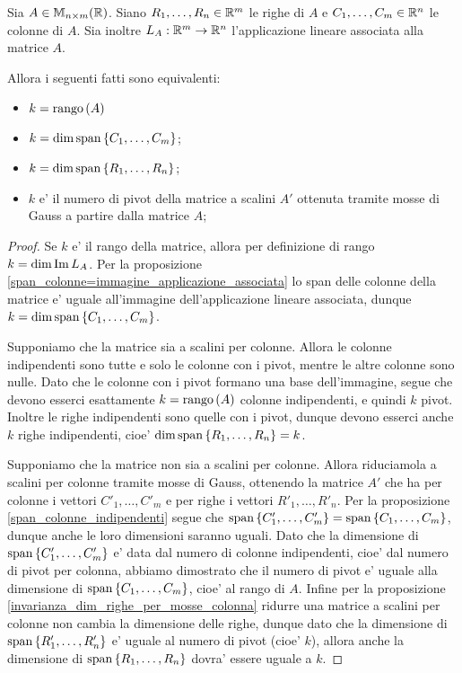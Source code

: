 \begin{proposition}
    Sia $A \in \mathbb{M}_{n \times m}(\mathbb{R})$. Siano $R_1, \dots, R_n \in \mathbb{R}^m$ le righe di $A$ e $C_1, \dots, C_m \in \mathbb{R}^n$ le colonne di $A$. Sia inoltre $L_A : \mathbb{R}^m \to \mathbb{R}^n$ l'applicazione lineare associata alla matrice $A$.
    
    Allora i seguenti fatti sono equivalenti:
    \begin{itemize}
        \item $k = \operatorname{rango}\left( A \right)$
        \item $k = \dim \operatorname{span}\left\{C_1, \dots, C_m\right\}$;
        \item $k = \dim \operatorname{span}\left\{R_1, \dots, R_n\right\}$;
        \item $k$ e' il numero di pivot della matrice a scalini $A'$ ottenuta tramite mosse di Gauss a partire dalla matrice $A$;
    \end{itemize}
\end{proposition}
\begin{proof}
    Se $k$ e' il rango della matrice, allora per definizione di rango $k = \dim \operatorname{Im}L_A$. Per la proposizione \ref{span_colonne=immagine_applicazione_associata} lo span delle colonne della matrice e' uguale all'immagine dell'applicazione lineare associata, dunque $k = \dim \operatorname{span}\left\{C_1, \dots, C_m\right\}$.

    Supponiamo che la matrice sia a scalini per colonne. Allora le colonne indipendenti sono tutte e solo le colonne con i pivot, mentre le altre colonne sono nulle. Dato che le colonne con i pivot formano una base dell'immagine, segue che devono esserci esattamente $k = \operatorname{rango}\left( A \right)$ colonne indipendenti, e quindi $k$ pivot. 
    Inoltre le righe indipendenti sono quelle con i pivot, dunque devono esserci anche $k$ righe indipendenti, cioe' $\dim \operatorname{span}\left\{R_1, \dots, R_n\right\} = k$.

    Supponiamo che la matrice non sia a scalini per colonne. Allora riduciamola a scalini per colonne tramite mosse di Gauss, ottenendo la matrice $A'$ che ha per colonne i vettori $C'_1, \dots, C'_m$ e per righe i vettori $R'_1, \dots, R'_n$.
    Per la proposizione \ref{span_colonne_indipendenti} segue che $\operatorname{span}\left\{C'_1, \dots, C'_m\right\} = \operatorname{span}\left\{C_1, \dots, C_m\right\}$, dunque anche le loro dimensioni saranno uguali. Dato che la dimensione di $\operatorname{span}\left\{C'_1, \dots, C'_m\right\}$ e' data dal numero di colonne indipendenti, cioe' dal numero di pivot per colonna, abbiamo dimostrato che il numero di pivot e' uguale alla dimensione di $\operatorname{span}\left\{C_1, \dots, C_m\right\}$, cioe' al rango di $A$. Infine per la proposizione \ref{invarianza_dim_righe_per_mosse_colonna} ridurre una matrice a scalini per colonne non cambia la dimensione delle righe, dunque dato che la dimensione di $\operatorname{span}\left\{R'_1, \dots, R'_n\right\}$ e' uguale al numero di pivot (cioe' $k$), allora anche la dimensione di $\operatorname{span}\left\{R_1, \dots, R_n\right\}$ dovra' essere uguale a $k$.
\end{proof}

